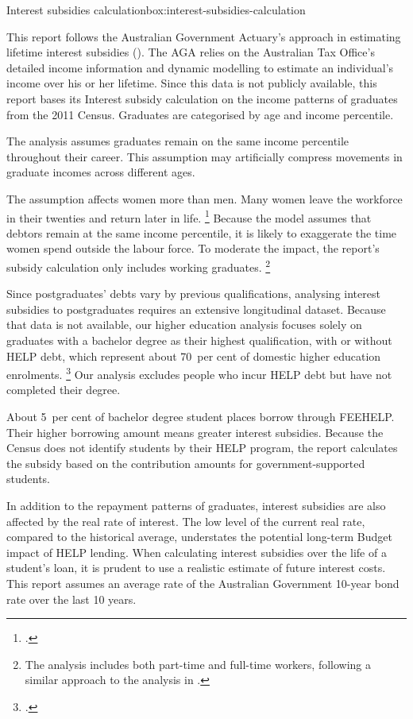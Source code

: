 \documentclass[embargoed]{grattan}
\begin{document}
\begin{bigbox*}{Interest subsidies calculation}{box:interest-subsidies-calculation}

This report follows the Australian Government Actuary's approach in estimating lifetime interest subsidies ().
The \gls{AGA} relies on the Australian Tax Office's detailed income information and dynamic modelling to estimate an individual's income over his or her lifetime. Since this data is not publicly available, this report bases its \gls{Interest subsidy} calculation on the income patterns of graduates from the 2011 Census.
Graduates are categorised by age and income percentile.

The analysis assumes graduates remain on the same income percentile throughout their career.
This assumption may artificially compress movements in graduate incomes across different ages.

The assumption affects women more than men.
Many women leave the workforce in their twenties and return later in life.%
\footcite[][Figure~9]{Norton2016HELPfuturefairer} Because the model assumes that debtors remain at the same income percentile, it is likely to exaggerate the time women spend outside the labour force.
To moderate the impact, the report's subsidy calculation only includes working graduates.%
\footnote{The analysis includes both part-time and full-time workers, following a similar approach to the analysis in \textcite[][7--8]{Chapman2014InquiryprovisionsHigher}.}

Since postgraduates’ debts vary by previous qualifications, analysing interest subsidies to postgraduates requires an extensive longitudinal dataset. Because that data is not available, our higher education analysis focuses solely on graduates with a bachelor degree as their highest qualification, with or without \gls{HELP} debt, which represent about 70~per cent of domestic higher education enrolments.%
\footnote{\textcite[][Table 2.6]{Education2016StudentsSelectedhigher}.} Our analysis excludes people who incur \gls{HELP} debt but have not completed their degree.

About 5~per cent of bachelor degree student places borrow through \gls{FEEHELP}\@.
Their higher borrowing amount means greater interest subsidies. Because the Census does not identify students by their \gls{HELP} program, the report calculates the subsidy based on the contribution amounts for government-supported students.

In addition to the repayment patterns of graduates, interest subsidies are also affected by the real rate of interest.
The low level of the current real rate, compared to the historical average, understates the potential long-term Budget impact of \gls{HELP} lending.
When calculating interest subsidies over the life of a student's loan, it is prudent to use a realistic estimate of future interest costs.
This report assumes an average rate of the Australian Government 10-year bond rate over the last 10 years.
\end{bigbox*}
\end{document}
